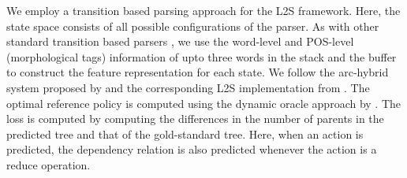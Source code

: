 \documentclass[11pt]{article}
\begin{document}
We employ a transition based parsing approach for the L2S framework.  Here, the state space consists of all possible configurations of the parser. As with other standard transition based parsers \cite{kuhlmann-etal-2011-dynamic}, we use the word-level and POS-level (morphological tags) information of upto three words in the stack and the buffer to construct the feature representation for each state. We follow the arc-hybrid system proposed by  and the corresponding L2S implementation from .  The optimal reference policy is computed using the dynamic oracle approach by . The loss is computed by computing the differences in the number of parents in the predicted tree and that of the gold-standard tree. Here, when an action is predicted, the dependency relation is also predicted whenever the action is a reduce operation. 


\end{document}
